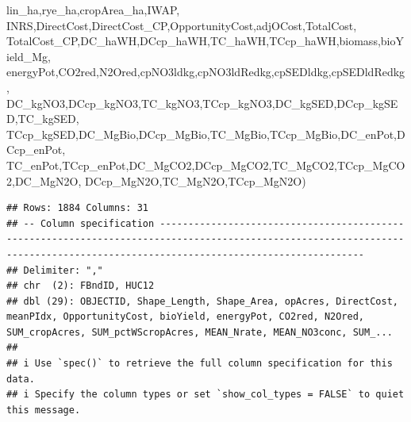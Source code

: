\documentclass[
]{article}
\newenvironment{Shaded}{\begin{snugshade}}{\end{snugshade}}
\newcommand{\NormalTok}[1]{#1}
\begin{document}
\begin{Shaded}
\begin{Highlighting}[]
\NormalTok{         lin\_ha,rye\_ha,cropArea\_ha,IWAP,}
\NormalTok{         INRS,DirectCost,DirectCost\_CP,OpportunityCost,adjOCost,TotalCost,}
\NormalTok{         TotalCost\_CP,DC\_haWH,DCcp\_haWH,TC\_haWH,TCcp\_haWH,biomass,bioYield\_Mg,}
\NormalTok{         energyPot,CO2red,N2Ored,cpNO3ldkg,cpNO3ldRedkg,cpSEDldkg,cpSEDldRedkg,}
\NormalTok{         DC\_kgNO3,DCcp\_kgNO3,TC\_kgNO3,TCcp\_kgNO3,DC\_kgSED,DCcp\_kgSED,TC\_kgSED,}
\NormalTok{         TCcp\_kgSED,DC\_MgBio,DCcp\_MgBio,TC\_MgBio,TCcp\_MgBio,DC\_enPot,DCcp\_enPot,}
\NormalTok{         TC\_enPot,TCcp\_enPot,DC\_MgCO2,DCcp\_MgCO2,TC\_MgCO2,TCcp\_MgCO2,DC\_MgN2O,}
\NormalTok{         DCcp\_MgN2O,TC\_MgN2O,TCcp\_MgN2O)}
\end{Highlighting}
\end{Shaded}

\begin{verbatim}
## Rows: 1884 Columns: 31
## -- Column specification --------------------------------------------------------------------------------------------------------------------------------------------------------------------------------
## Delimiter: ","
## chr  (2): FBndID, HUC12
## dbl (29): OBJECTID, Shape_Length, Shape_Area, opAcres, DirectCost, meanPIdx, OpportunityCost, bioYield, energyPot, CO2red, N2Ored, SUM_cropAcres, SUM_pctWScropAcres, MEAN_Nrate, MEAN_NO3conc, SUM_...
## 
## i Use `spec()` to retrieve the full column specification for this data.
## i Specify the column types or set `show_col_types = FALSE` to quiet this message.
\end{verbatim}
\end{document}
